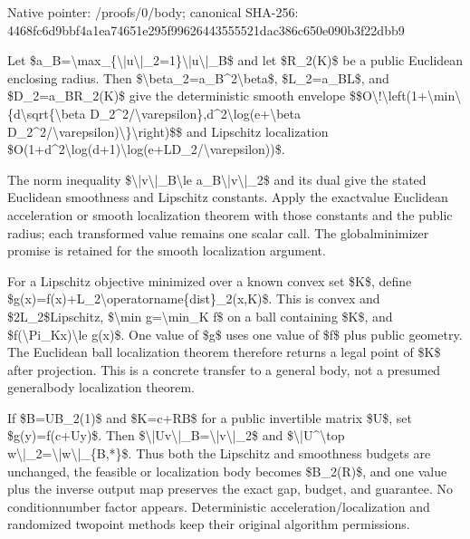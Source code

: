 \documentclass[10pt,a4paper]{article}
\begin{document}
Native pointer: /proofs/0/body; canonical SHA-256: 4468fc6d9bbf4a1ea74651e2\allowbreak{}95f99626443555521dac386c\allowbreak{}650e090b3f22dbb9


Let \$a\_B=\textbackslash{}max\_\{\textbackslash{}|u\textbackslash{}|\_2=1\}\textbackslash{}|u\textbackslash{}|\_B\$ and let \$R\_2(K)\$ be a public Euclidean enclosing radius. Then \$\textbackslash{}beta\_2=a\_B\textasciicircum{}2\textbackslash{}beta\$, \$L\_2=a\_BL\$, and \$D\_2=a\_BR\_2(K)\$ give the deterministic smooth envelope
\$\$O\textbackslash{}!\textbackslash{}left(1+\textbackslash{}min\textbackslash{}\{d\textbackslash{}sqrt\{\textbackslash{}beta D\_2\textasciicircum{}2/\textbackslash{}varepsilon\},d\textasciicircum{}2\textbackslash{}log(e+\textbackslash{}beta D\_2\textasciicircum{}2/\textbackslash{}varepsilon)\textbackslash{}\}\textbackslash{}right)\$\$
and Lipschitz localization \$O(1+d\textasciicircum{}2\textbackslash{}log(d+1)\textbackslash{}log(e+\allowbreak{}LD\_2/\textbackslash{}varepsilon))\$.

The norm inequality \$\textbackslash{}|v\textbackslash{}|\_B\textbackslash{}le a\_B\textbackslash{}|v\textbackslash{}|\_2\$ and its dual give the stated Euclidean smoothness and Lipschitz constants. Apply the exactvalue Euclidean acceleration or smooth localization theorem with those constants and the public radius; each transformed value remains one scalar call. The globalminimizer promise is retained for the smooth localization argument.

For a Lipschitz objective minimized over a known convex set \$K\$, define \$g(x)=f(x)+L\_2\textbackslash{}operatorn\allowbreak{}ame\{dist\}\_2(x,K)\$. This is convex and \$2L\_2\$Lipschitz, \$\textbackslash{}min g=\textbackslash{}min\_K f\$ on a ball containing \$K\$, and \$f(\textbackslash{}Pi\_Kx)\textbackslash{}le g(x)\$. One value of \$g\$ uses one value of \$f\$ plus public geometry. The Euclidean ball localization theorem therefore returns a legal point of \$K\$ after projection. This is a concrete transfer to a general body, not a presumed generalbody localization theorem.

If \$B=UB\_2(1)\$ and \$K=c+RB\$ for a public invertible matrix \$U\$, set \$g(y)=f(c+Uy)\$. Then \$\textbackslash{}|Uv\textbackslash{}|\_B=\textbackslash{}|v\textbackslash{}|\_2\$ and \$\textbackslash{}|U\textasciicircum{}\textbackslash{}top w\textbackslash{}|\_2=\textbackslash{}|w\textbackslash{}|\_\{B,*\}\$. Thus both the Lipschitz and smoothness budgets are unchanged, the feasible or localization body becomes \$B\_2(R)\$, and one value plus the inverse output map preserves the exact gap, budget, and guarantee. No conditionnumber factor appears. Deterministic acceleration/localization and randomized twopoint methods keep their original algorithm permissions.
\end{document}
